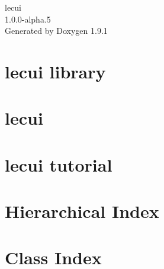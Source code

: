 \let\mypdfximage\pdfximage\def\pdfximage{\immediate\mypdfximage}\documentclass[twoside]{book}
\newcommand{\+}{\discretionary{\mbox{\scriptsize$\hookleftarrow$}}{}{}}
\newcommand{\clearemptydoublepage}{%
  \newpage{\pagestyle{empty}\cleardoublepage}%
}
\begin{document}
\raggedbottom

\hypersetup{pageanchor=false,
             bookmarksnumbered=true,
             pdfencoding=unicode
            }
\begin{titlepage}
\vspace*{7cm}
\begin{center}%
{\Large lecui \\[1ex]\large 1.\+0.\+0-\/alpha.\+5 }\\
\vspace*{1cm}
{\large Generated by Doxygen 1.9.1}\\
\end{center}
\end{titlepage}
\clearemptydoublepage
{}
\tableofcontents
\clearemptydoublepage
{}
\hypersetup{pageanchor=true}

\chapter{lecui library}
\label{md__l_i_c_e_n_s_e}

\chapter{lecui}
\label{md__r_e_a_d_m_e}

\chapter{lecui tutorial}
\label{md__t_u_t_o_r_i_a_l}

\chapter{Hierarchical Index}

\chapter{Class Index}

\end{document}

